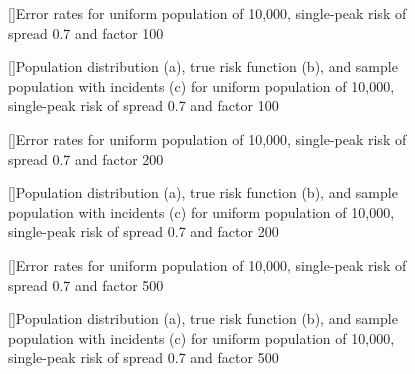{%

\begin{figure}[!htb]
    
    []{Error rates for uniform population of 10,000, single-peak risk of \gls{spread} 0.7 and \gls{factor} 100}
    \label{tab:mean_error_rates:unif_100_0.7_1h}
    
    []{Population distribution (a), true risk function (b), and sample population with incidents (c) for uniform population of 10,000, single-peak risk of \gls{spread} 0.7 and \gls{factor} 100}
    \label{fig:distributions:unif_100_0.7_1h}    
\end{figure}



\begin{figure}[!htb]
    
    []{Error rates for uniform population of 10,000, single-peak risk of \gls{spread} 0.7 and \gls{factor} 200}
    \label{tab:mean_error_rates:unif_200_0.7_1h}
    
    []{Population distribution (a), true risk function (b), and sample population with incidents (c) for uniform population of 10,000, single-peak risk of \gls{spread} 0.7 and \gls{factor} 200}
    \label{fig:distributions:unif_200_0.7_1h}    
\end{figure}



\begin{figure}[!htb]
    
    []{Error rates for uniform population of 10,000, single-peak risk of \gls{spread} 0.7 and \gls{factor} 500}
    \label{tab:mean_error_rates:unif_500_0.7_1h}
    
    []{Population distribution (a), true risk function (b), and sample population with incidents (c) for uniform population of 10,000, single-peak risk of \gls{spread} 0.7 and \gls{factor} 500}
    \label{fig:distributions:unif_500_0.7_1h}    
\end{figure}



}
